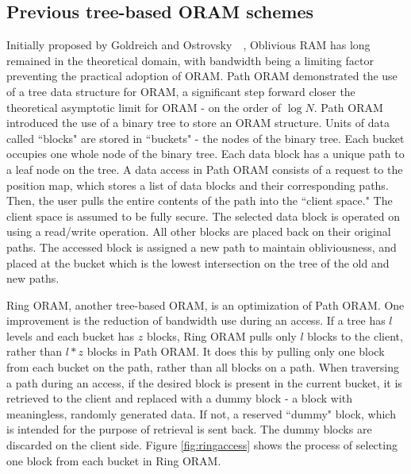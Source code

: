 \documentclass[12pt, oneside]{article}   	%
\begin{document}
\subsection{Previous tree-based ORAM schemes}
Initially proposed by Goldreich and Ostrovsky~\cite{gold}~\cite{goldostrov}, Oblivious RAM has long remained in the theoretical domain, with bandwidth being a limiting factor preventing the practical adoption of ORAM. Path ORAM demonstrated the use of a tree data structure for ORAM, a significant step forward closer the theoretical asymptotic limit for ORAM - on the order of $\log N$. Path ORAM introduced the use of a binary tree to store an ORAM structure. Units of data called ``blocks" are stored in ``buckets" - the nodes of the binary tree. Each bucket occupies one whole node of the binary tree. Each data block has a unique path to a leaf node on the tree. A data access in Path ORAM consists of a request to the position map, which stores a list of data blocks and their corresponding paths. Then, the user pulls the entire contents of the path into the ``client space." The client space is assumed to be fully secure. The selected data block is operated on using a read/write operation. All other blocks are placed back on their original paths. The accessed block is assigned a new path to maintain obliviousness, and placed at the bucket which is the lowest intersection on the tree of the old and new paths. 

Ring ORAM, another tree-based ORAM, is an optimization of Path ORAM. One improvement is the reduction of bandwidth use during an access. If a tree has $l$ levels and each bucket has $z$ blocks, Ring ORAM pulls only $l$ blocks to the client, rather than $l*z$ blocks in Path ORAM. It does this by pulling only one block from each bucket on the path, rather than all blocks on a path. When traversing a path during an access, if the desired block is present in the current bucket, it is retrieved to the client and replaced with a dummy block - a block with meaningless, randomly generated data. If not, a reserved ``dummy" block, which is intended for the purpose of retrieval is sent back. The dummy blocks are discarded on the client side. Figure \ref{fig:ringaccess} shows the process of selecting one block from each bucket in Ring ORAM.
\end{document}
